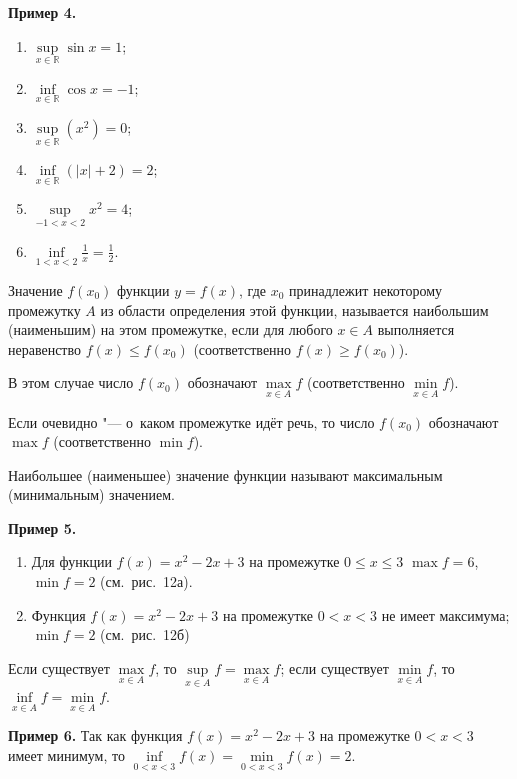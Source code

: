 \textbf{Пример 4.}
\begin{enumerate}
\item $\sup\limits_{x \in \mathbb{R}} \sin x = 1$;
\item $\inf\limits_{x \in \mathbb{R}} \cos x = -1$;
\item $\sup\limits_{x \in \mathbb{R}} (x^{2}) = 0$;
\item $\inf\limits_{x \in \mathbb{R}} (|x| + 2) = 2$;
\item $\sup\limits_{-1<x<2} x^{2} = 4$;
\item $\displaystyle \inf\limits_{1<x<2} \frac{1}{x} = \frac{1}{2}$.
\end{enumerate}

\begin{Def}
Значение $f(x_{0})$ функции $y = f(x)$, где $x_{0}$ принадлежит
некоторому промежутку $A$ из области определения этой функции,
называется наибольшим (наименьшим) на этом промежутке,
если для любого $x \in A$ выполняется неравенство $f(x) \leqslant f(x_{0})$
(соответственно $f(x) \geqslant f(x_{0})$).

В этом случае число $f(x_{0})$ обозначают $\max\limits_{x \in A} f$
(соответственно $\min\limits_{x \in A} f$).
\end{Def}

Если очевидно "--- о~каком промежутке идёт речь, то число $f(x_{0})$
обозначают $\max f$ (соответственно $\min f$).

Наибольшее (наименьшее) значение функции называют максимальным
(минимальным) значением.

\textbf{Пример 5.}
\begin{enumerate}
\item Для функции $f(x) = x^{2} - 2x + 3$ на промежутке
$0 \leqslant x \leqslant 3$ $\max f = 6$, $\min f = 2$
(см.\ рис.\ 12а).

\item Функция $f(x) = x^{2} - 2x + 3$ на промежутке
$0 < x <3$ не имеет максимума; $\min f = 2$ (см.\ рис.\ 12б)
\end{enumerate}

Если существует $\max\limits_{x \in A} f$,
то $\sup\limits_{x \in A} f = \max\limits_{x \in A} f$;
если существует $\min\limits_{x \in A} f$,
то $\inf\limits_{x \in A} f = \min\limits_{x \in A} f$.

\textbf{Пример 6.}
Так как функция $f(x) = x^{2} - 2x + 3$ на промежутке $0 < x < 3$
имеет минимум, то $\inf\limits_{0<x<3} f(x) = \min\limits_{0<x<3} f(x) = 2$.


